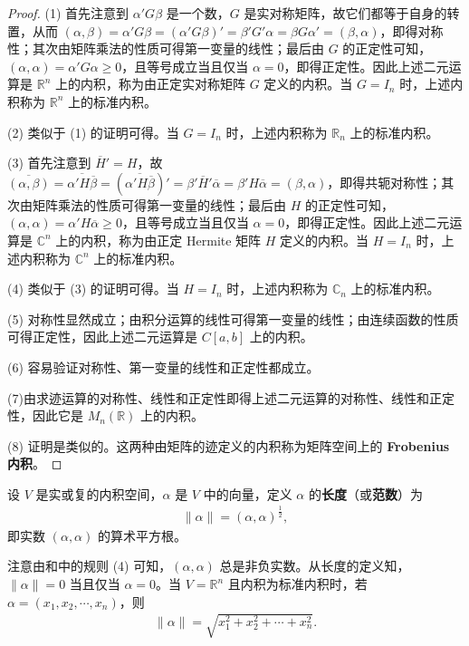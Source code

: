 \documentclass[../../main.tex]{subfiles}
\begin{document}
\begin{proof}
(1) 首先注意到 $\alpha'G\beta$ 是一个数，$G$ 是实对称矩阵，故它们都等于自身的转置，从而 $(\alpha, \beta) = \alpha'G\beta = (\alpha'G\beta)' = \beta'G'\alpha = \beta G\alpha' = (\beta, \alpha)$，即得对称性；其次由矩阵乘法的性质可得第一变量的线性；最后由 $G$ 的正定性可知，$(\alpha, \alpha) = \alpha'G\alpha \geqslant  0$，且等号成立当且仅当 $\alpha = 0$，即得正定性。因此上述二元运算是 $\mathbb{R}^n$ 上的内积，称为由正定实对称矩阵 $G$ 定义的内积。当 $G = I_n$ 时，上述内积称为 $\mathbb{R}^n$ 上的标准内积。

(2) 类似于 (1) 的证明可得。当 $G = I_n$ 时，上述内积称为 $\mathbb{R}_n$ 上的标准内积。

(3) 首先注意到 $\overline{H}' = H$，故 $\overline{(\alpha, \beta)} = \overline{\alpha' H\overline{\beta}} = (\overline{\alpha' H\overline{\beta}})' = \beta'\overline{H}'\overline{\alpha} = \beta' H\overline{\alpha} = (\beta, \alpha)$，即得共轭对称性；其次由矩阵乘法的性质可得第一变量的线性；最后由 $H$ 的正定性可知，$(\alpha, \alpha) = \alpha' H\overline{\alpha} \geqslant  0$，且等号成立当且仅当 $\alpha = 0$，即得正定性。因此上述二元运算是 $\mathbb{C}^n$ 上的内积，称为由正定 Hermite 矩阵 $H$ 定义的内积。当 $H = I_n$ 时，上述内积称为 $\mathbb{C}^n$ 上的标准内积。

(4) 类似于 (3) 的证明可得。当 $H = I_n$ 时，上述内积称为 $\mathbb{C}_n$ 上的标准内积。

(5) 对称性显然成立；由积分运算的线性可得第一变量的线性；由连续函数的性质可得正定性，因此上述二元运算是 $C[a, b]$ 上的内积。

(6) 容易验证对称性、第一变量的线性和正定性都成立。

(7)由求迹运算的对称性、线性和正定性即得上述二元运算的对称性、线性和正定性，因此它是 $M_n(\mathbb{R})$ 上的内积。

(8) 证明是类似的。这两种由矩阵的迹定义的内积称为矩阵空间上的 \hypertarget{Frobenius 内积}{\textbf{Frobenius 内积}}。

\end{proof}

\begin{definition}[范数]\label{definition:向量的长度或范数}
设 \(V\) 是实或复的内积空间，\(\alpha\) 是 \(V\) 中的向量，定义 \(\alpha\) 的\textbf{长度}（或\textbf{范数}）为
\begin{align*}
\|\alpha\|=(\alpha,\alpha)^{\frac{1}{2}},
\end{align*}
即实数 \((\alpha,\alpha)\) 的算术平方根。
\end{definition}
\begin{remark}
注意由和中的规则 (4) 可知，\((\alpha,\alpha)\) 总是非负实数。从长度的定义知，\(\|\alpha\| = 0\) 当且仅当 \(\alpha = 0\)。当 \(V=\mathbb{R}^n\) 且内积为标准内积时，若 \(\alpha=(x_1,x_2,\cdots,x_n)\)，则
\begin{align*}
\|\alpha\|=\sqrt{x_1^2 + x_2^2+\cdots + x_n^2}.
\end{align*}
\end{remark}
\end{document}
